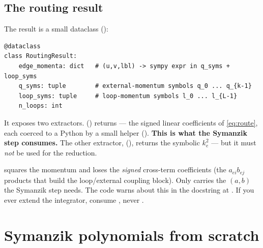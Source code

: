 \subsection{The routing result}

The result is a small dataclass ():

\begin{lstlisting}
@dataclass
class RoutingResult:
    edge_momenta: dict   # (u,v,lbl) -> sympy expr in q_syms + loop_syms
    q_syms: tuple        # external-momentum symbols q_0 ... q_{k-1}
    loop_syms: tuple     # loop-momentum symbols l_0 ... l_{L-1}
    n_loops: int
\end{lstlisting}

It exposes two extractors. 
() returns  --- the signed
linear coefficients of \eqref{eq:route}, each coerced to a Python  by a
small helper  (). \textbf{This is what
the Symanzik step consumes.} The other extractor, 
(), returns the symbolic $k_e^2$ --- but it must
\emph{not} be used for the reduction.

\begin{gotcha}
 squares the momentum and loses the \emph{signed} cross-term
coefficients (the $a_{ei}b_{ej}$ products that build the loop/external coupling
block). Only  carries the $(a,b)$ the Symanzik step needs.
The code warns about this in the docstring at
. If you ever extend the integrator, consume
, never .
\end{gotcha}

\section{Symanzik polynomials from scratch}\label{sec:symanzik}

